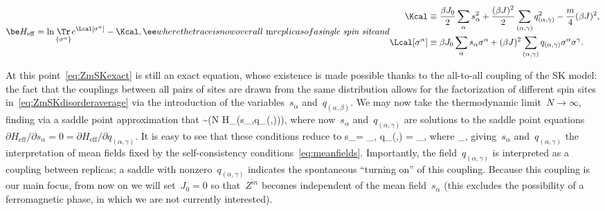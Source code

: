 \documentclass[12pt]{article}
\begin{document}
\begin{subequations}
\be
H_\mathrm{eff} = \ln \underset{\{\sigma^\alpha\}}{\Tr} e^{\Lcal[\sigma^\alpha]} - \Kcal,
\ee
where the trace is now over all~$m$ replicas of a \textit{single spin site} and
\begin{align}
\Kcal &\equiv \frac{\beta J_0}{2} \sum_\alpha s_\alpha^2 + \frac{(\beta J)^2}{2} \sum_{(\alpha,\gamma)} q_{(\alpha,\gamma)}^2 - \frac{m}{4} (\beta J)^2, \\
\Lcal[\sigma^\alpha] &\equiv \beta J_0 \sum_{\alpha} s_{\alpha} \sigma^{\alpha} + (\beta J)^2 \sum_{(\alpha,\gamma)} q_{(\alpha,\gamma)} \sigma^{\alpha} \sigma^{\gamma}.
\end{align}
\end{subequations}

At this point~\eqref{eq:ZmSKexact} is still an exact equation, whose existence is made possible thanks to the all-to-all coupling of the SK model:  the fact that the couplings between all pairs of sites are drawn from the same distribution allows for the factorization of different spin sites in~\eqref{eq:ZmSKdisorderaverage} via the introduction of the variables~$s_\alpha$ and~$q_{(\alpha,\beta)}$.  We may now take the thermodynamic limit~$N \to \infty$, finding via a saddle point approximation that
\be
\label{eq:ZmSKsaddle}
 \sim \exp\left(N H_\left(s_\alpha,q_{(\alpha,\gamma)}\right)\right),
\ee
where now~$s_\alpha$ and~$q_{(\alpha,\gamma)}$ are solutions to the saddle point equations~$\partial H_\mathrm{eff}/\partial s_\alpha = 0 = \partial H_\mathrm{eff}/\partial q_{(\alpha,\gamma)}$.  It is easy to see that these conditions reduce to
\be
\label{eq:meanfields}
s_\alpha = \ev{\sigma^\alpha}_\Lcal, \qquad q_{(\alpha,\gamma)} = \ev{\sigma^\alpha \sigma^\gamma}_\Lcal, \quad \mbox{where} \quad {}_\Lcal \equiv {},
\ee
giving~$s_\alpha$ and~$q_{(\alpha,\gamma)}$ the interpretation of mean fields fixed by the self-consistency conditions~\eqref{eq:meanfields}.  Importantly, the field~$q_{(\alpha,\gamma)}$ is interpreted as a coupling between replicas; a saddle with nonzero~$q_{(\alpha,\gamma)}$ indicates the spontaneous ``turning on'' of this coupling.  Because this coupling is our main focus, from now on we will set~$J_0 = 0$ so that~$\overline{Z^m}$ becomes independent of the mean field~$s_\alpha$ (this excludes the possibility of a ferromagnetic phase, in which we are not currently interested).
\end{document}
